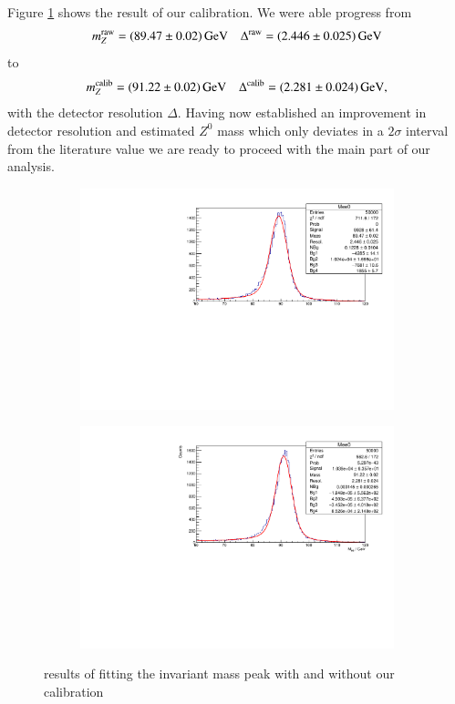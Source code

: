 \documentclass[11pt,a4paper,notitlepage]{scrartcl}
\begin{document}
Figure \ref{fig:calib} shows the result of our calibration. We were able progress from \begin{align*}
	m_Z^{\text{raw}}=\SI{89.47\pm0.02}{\giga\eV} && \Delta^\text{raw}=\SI{2.446\pm0.025}{\giga\eV}
\end{align*}
to 
\begin{align*}
	m_Z^{\text{calib}}=\SI{91.22\pm0.02}{\giga\eV} && \Delta^\text{calib}=\SI{2.281\pm0.024}{\giga\eV},
\end{align*}
with the detector resolution $\Delta$. Having now established an improvement in detector resolution and estimated $Z^0$ mass which only deviates in a $2\sigma$ interval from the literature value we are ready to proceed with the main part of our analysis.
\begin{figure}[htbp]
	\begin{subfigure}{.49\linewidth}
		\includegraphics[width=\linewidth]{P1_pics/calibration/Zee_fit_no_calibration.pdf}
	\end{subfigure}
\begin{subfigure}{.49\linewidth}
	\includegraphics[width=\linewidth]{P1_pics/calibration/Zee_fit_calibration.pdf}
\end{subfigure}
\caption{results of fitting the invariant mass peak with and without our calibration}
\label{fig:calib}
\end{figure} 
\end{document}
